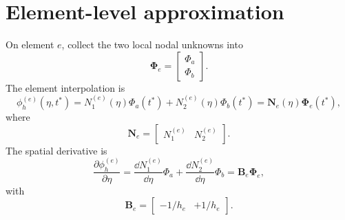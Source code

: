 \documentclass[11pt]{article}
\begin{document}
\section{Element-level approximation}
On element \(e\), collect the two local nodal unknowns into
\begin{equation}
    \bm{\Phi}_e=
    \begin{bmatrix}
    \Phi_a\\
    \Phi_b
    \end{bmatrix}.
\end{equation}
The element interpolation is
\begin{equation}
    \phi_h^{(e)}(\eta,t^*)
    =N_1^{(e)}(\eta)\Phi_a(t^*)+N_2^{(e)}(\eta)\Phi_b(t^*)
    =\bm{N}_e(\eta)\bm{\Phi}_e(t^*),
\end{equation}
where
\begin{equation}
    \bm{N}_e=
    \begin{bmatrix}
    N_1^{(e)} & N_2^{(e)}
    \end{bmatrix}.
\end{equation}
The spatial derivative is
\begin{equation}
    \frac{\partial\phi_h^{(e)}}{\partial\eta}
    =\frac{\dd N_1^{(e)}}{\dd\eta}\Phi_a
    +\frac{\dd N_2^{(e)}}{\dd\eta}\Phi_b
    =\bm{B}_e\bm{\Phi}_e,
\end{equation}
with
\begin{equation}
    \bm{B}_e=
    \begin{bmatrix}
    -1/h_e & +1/h_e
    \end{bmatrix}.
\end{equation}
\end{document}
